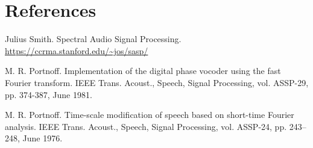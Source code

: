 \documentclass{article}
\begin{document}
\section{References}
\hspace{4mm} Julius Smith. Spectral Audio Signal Processing. \url{https://ccrma.stanford.edu/~jos/sasp/}

\vspace{3mm}

M. R. Portnoff. Implementation of the digital phase vocoder using the fast Fourier transform. IEEE Trans. Acoust., Speech, Signal Processing, vol. ASSP-29, pp. 374-387, June 1981.

\vspace{3mm}

M. R. Portnoff. Time-scale modification of speech based on short-time Fourier analysis. IEEE Trans. Acoust., Speech, Signal Processing, vol. ASSP-24, pp. 243–248, June 1976.
\end{document}

